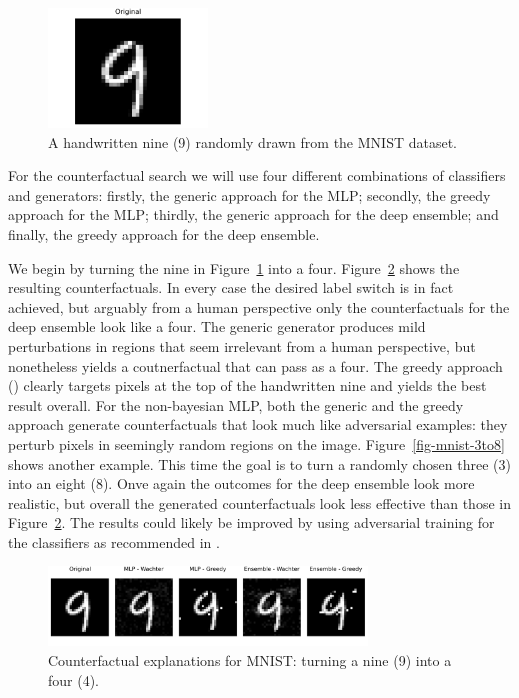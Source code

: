 \documentclass{juliacon}
\begin{document}
\begin{figure}

{\centering \includegraphics[width=1.66667in,height=1.25in]{www/mnist_original.png}

}

\caption{\label{fig-mnist-orig}A handwritten nine (9) randomly drawn
from the MNIST dataset.}

\end{figure}

For the counterfactual search we will use four different combinations of
classifiers and generators: firstly, the generic approach for the MLP;
secondly, the greedy approach for the MLP; thirdly, the generic approach
for the deep ensemble; and finally, the greedy approach for the deep
ensemble.

We begin by turning the nine in Figure~\ref{fig-mnist-orig} into a four.
Figure~\ref{fig-mnist-9to4} shows the resulting counterfactuals. In
every case the desired label switch is in fact achieved, but arguably
from a human perspective only the counterfactuals for the deep ensemble
look like a four. The generic generator produces mild perturbations in
regions that seem irrelevant from a human perspective, but nonetheless
yields a coutnerfactual that can pass as a four. The greedy approach
(\cite{schut2021generating}) clearly targets pixels at the top of the
handwritten nine and yields the best result overall. For the
non-bayesian MLP, both the generic and the greedy approach generate
counterfactuals that look much like adversarial examples: they perturb
pixels in seemingly random regions on the image.
Figure~\ref{fig-mnist-3to8} shows another example. This time the goal is
to turn a randomly chosen three (3) into an eight (8). Onve again the
outcomes for the deep ensemble look more realistic, but overall the
generated counterfactuals look less effective than those in
Figure~\ref{fig-mnist-9to4}. The results could likely be improved by
using adversarial training for the classifiers as recommended in
\cite{schut2021generating}.

\begin{figure}

{\centering \includegraphics[width=3.33333in,height=0.83333in]{www/mnist_9_to_4.png}

}

\caption{\label{fig-mnist-9to4}Counterfactual explanations for MNIST:
turning a nine (9) into a four (4).}

\end{figure}
\end{document}
